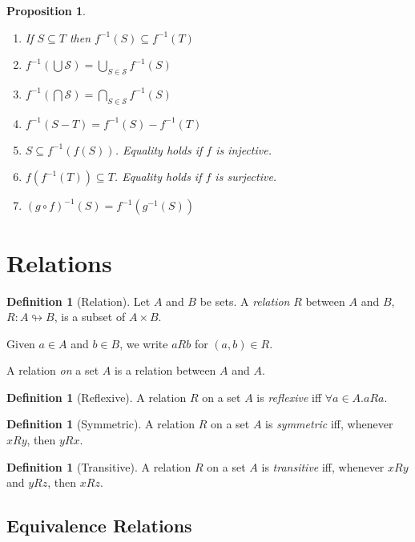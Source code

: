 \documentclass{book}
\newtheorem{prop}[ax]{Proposition}
\theoremstyle{definition}
\newtheorem{df}[ax]{Definition}
\newcommand{\inv}[1]{\ensuremath{{#1}^{-1}}}
\begin{document}
\begin{prop}
\begin{enumerate}
\item If $S \subseteq T$ then $\inv{f}(S) \subseteq \inv{f}(T)$
\item $\inv{f}(\bigcup \mathcal{S}) = \bigcup_{S \in \mathcal{S}} \inv{f}(S)$
\item $\inv{f}(\bigcap \mathcal{S}) = \bigcap_{S \in \mathcal{S}} \inv{f}(S)$
\item $\inv{f}(S - T) = \inv{f}(S) - \inv{f}(T)$
\item $S \subseteq \inv{f}(f(S))$. Equality holds if $f$ is injective.
\item $f(\inv{f}(T)) \subseteq T$. Equality holds if $f$ is surjective.
\item $\inv{(g \circ f)}(S) = \inv{f}(\inv{g}(S))$
\end{enumerate}
\end{prop}

\section{Relations} %

\begin{df}[Relation]
Let $A$ and $B$ be sets. A \emph{relation} $R$ between $A$ and $B$, $R : A \looparrowright B$, is a subset of $A \times B$.

Given $a \in A$ and $b \in B$, we write $aRb$ for $(a,b) \in R$.

A relation \emph{on} a set $A$ is a relation between $A$ and $A$.
\end{df}

\begin{df}[Reflexive]
A relation $R$ on a set $A$ is \emph{reflexive} iff $\forall a \in A. aRa$.
\end{df}

\begin{df}[Symmetric]
A relation $R$ on a set $A$ is \emph{symmetric} iff, whenever $xRy$, then $yRx$.
\end{df}

\begin{df}[Transitive]
A relation $R$ on a set $A$ is \emph{transitive} iff, whenever $xRy$ and $yRz$, then $xRz$.
\end{df}

\subsection{Equivalence Relations}
\end{document}
